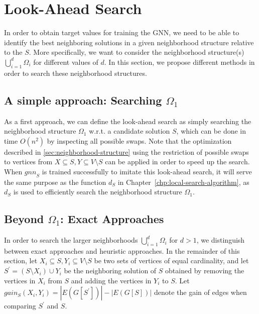 \documentclass[draft,final]{vutinfth} %
\begin{document}
\section{Look-Ahead Search}\label{sec:lookahead-search}

In order to obtain target values for training the GNN, we need to be able to identify the best neighboring solutions in a given neighborhood structure relative to the $S$. More specifically, we want to consider the neighborhood structure(s) $\bigcup_{i=1}^d \Omega_i$ for different values of $d$. In this section, we propose different methods in order to search these neighborhood structures. 

\subsection{A simple approach: Searching $\Omega_1$}

As a first approach, we can define the look-ahead search as simply searching the neighborhood structure $\Omega_1$ w.r.t. a candidate solution $S$, which can be done in time $O(n^2)$ by inspecting all possible swaps. Note that the optimization described in \ref{sec:neighborhood-structure} using the restriction of possible swaps to vertices from $X \subseteq S, Y \subseteq V \setminus S$ can be applied in order to speed up the search. 
When $\mathit{gnn}_S$ is trained successfully to imitate this look-ahead search, it will serve the same purpose as the function $d_S$ in Chapter~\ref{chp:local-search-algorithm}, as $d_S$ is used to efficiently search the neighborhood structure $\Omega_1$. 

\subsection{Beyond $\Omega_1$: Exact Approaches}

In order to search the larger neighborhoods $\bigcup_{i=1}^d \Omega_i$ for $d > 1$, we distinguish between exact approaches and heuristic approaches. 
In the remainder of this section, let $X_i \subseteq S, Y_i \subseteq V\setminus S$ be two sets of vertices of equal cardinality, and let $S^\prime = (S \setminus X_i) \cup Y_i$ be the neighboring solution of $S$ obtained by removing the vertices in $X_i$ from $S$ and adding the vertices in $Y_i$ to $S$. Let $\mathit{gain_S}(X_i, Y_i) = |E(G[S^\prime])| - |E(G[S])|$ denote the gain of edges when comparing $S^\prime$ and $S$.   
\end{document}

